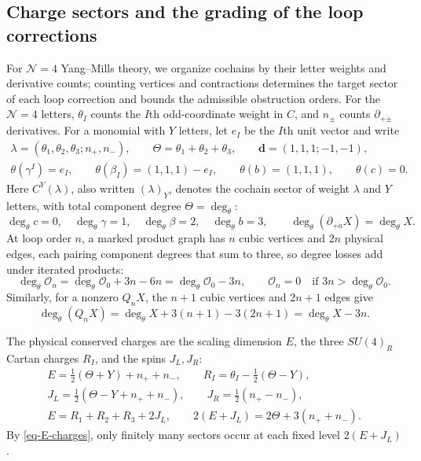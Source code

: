 \documentclass[11pt]{article}
\numberwithin{equation}{section}
\numberwithin{figure}{section}
\numberwithin{table}{section}
\begin{document}
\subsection{Charge sectors and the grading of the loop corrections}\label{sec-E-sectors}

For $\mathcal N=4$ Yang--Mills theory, we organize cochains by their letter weights and derivative counts; counting vertices and contractions determines the target sector of each loop correction and bounds the admissible obstruction orders. For the $\mathcal N=4$ letters, $\theta_I$ counts the $I$th odd-coordinate weight in $C$, and $n_\pm$ counts $\partial_{+\dot\pm}$ derivatives. For a monomial with $Y$ letters, let $e_I$ be the $I$th unit vector and write
\begin{equation}\label{eq-E-sector}
\begin{gathered}\lambda=(\theta_1,\theta_2,\theta_3;n_+,n_-),\qquad \Theta=\theta_1+\theta_2+\theta_3,\qquad \mathbf d=(1,1,1;-1,-1),\\ \theta(\gamma^I)=e_I,\qquad \theta(\beta_I)=(1,1,1)-e_I,\qquad \theta(b)=(1,1,1),\qquad \theta(c)=0.\end{gathered}
\end{equation}
Here $C^Y(\lambda)$, also written $(\lambda)_Y$, denotes the cochain sector of weight $\lambda$ and $Y$ letters, with total component degree $\Theta=\deg_\theta$:
\begin{equation}\label{eq-2-62}
\deg_\theta c=0,\quad\deg_\theta\gamma=1,\quad\deg_\theta\beta=2,\quad\deg_\theta b=3,\qquad\deg_\theta(\partial_{+\dot a}X)=\deg_\theta X.
\end{equation}
At loop order $n$, a marked product graph has $n$ cubic vertices and $2n$ physical edges, each pairing component degrees that sum to three, so degree losses add under iterated products:
\begin{equation}\label{eq-2-63}
\deg_\theta\mathcal O_n=\deg_\theta\mathcal O_0+{3n}-{6n}=\deg_\theta\mathcal O_0-3n,\qquad\mathcal O_n=0\quad\text{if }3n>\deg_\theta\mathcal O_0.
\end{equation}
Similarly, for a nonzero $Q_nX$, the $n+1$ cubic vertices and $2n+1$ edges give
\begin{equation}\label{eq-graviton-differential-degree}
\deg_\theta(Q_nX)
=\deg_\theta X+3(n+1)-3(2n+1)=\deg_\theta X-3n.
\end{equation}

The physical conserved charges are the scaling dimension $E$, the three $SU(4)_R$ Cartan charges $R_I$, and the spins $J_L,J_R$:
\begin{equation}\label{eq-E-charges}
\begin{gathered}E=\tfrac12(\Theta+Y)+n_++n_-,\qquad R_I=\theta_I-\tfrac12(\Theta-Y),\\ J_L=\tfrac12(\Theta-Y+n_++n_-),\qquad J_R=\tfrac12(n_+-n_-),\\ E=R_1+R_2+R_3+2J_L,\qquad 2(E+J_L)=2\Theta+3(n_++n_-).\end{gathered}
\end{equation}
By \eqref{eq-E-charges}, only finitely many sectors occur at each fixed level $2(E+J_L)$.
\end{document}
